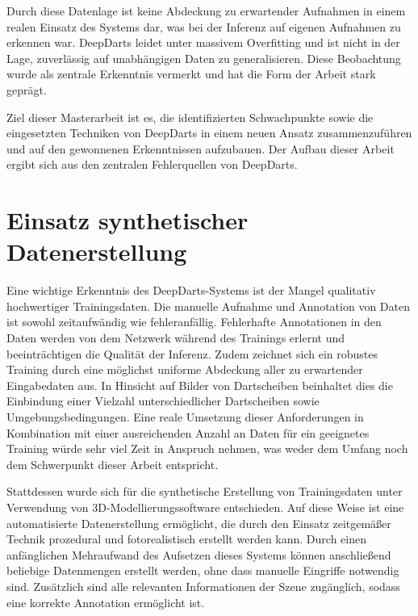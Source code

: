 Durch diese Datenlage ist keine Abdeckung zu erwartender Aufnahmen in einem realen Einsatz des Systems dar, was bei der Inferenz auf eigenen Aufnahmen zu erkennen war. DeepDarts leidet unter massivem Overfitting und ist nicht in der Lage, zuverlässig auf unabhängigen Daten zu generalisieren. Diese Beobachtung wurde als zentrale Erkenntnis vermerkt und hat die Form der Arbeit stark geprägt.

Ziel dieser Masterarbeit ist es, die identifizierten Schwachpunkte sowie die eingesetzten Techniken von DeepDarts in einem neuen Ansatz zusammenzuführen und auf den gewonnenen Erkenntnissen aufzubauen. Der Aufbau dieser Arbeit ergibt sich aus den zentralen Fehlerquellen von DeepDarts.



\section{Einsatz synthetischer Datenerstellung}
\label{sec:einsatz_daten}

Eine wichtige Erkenntnis des DeepDarts-Systems ist der Mangel qualitativ hochwertiger Trainingsdaten. Die manuelle Aufnahme und Annotation von Daten ist sowohl zeitaufwändig wie fehleranfällig. Fehlerhafte Annotationen in den Daten werden von dem Netzwerk während des Trainings erlernt und beeinträchtigen die Qualität der Inferenz. Zudem zeichnet sich ein robustes Training durch eine möglichst uniforme Abdeckung aller zu erwartender Eingabedaten aus. In Hinsicht auf Bilder von Dartscheiben beinhaltet dies die Einbindung einer Vielzahl unterschiedlicher Dartscheiben sowie Umgebungsbedingungen. Eine reale Umsetzung dieser Anforderungen in Kombination mit einer ausreichenden Anzahl an Daten für ein geeignetes Training würde sehr viel Zeit in Anspruch nehmen, was weder dem Umfang noch dem Schwerpunkt dieser Arbeit entspricht.

Stattdessen wurde sich für die synthetische Erstellung von Trainingsdaten unter Verwendung von 3D-Modellierungssoftware entschieden. Auf diese Weise ist eine automatisierte Datenerstellung ermöglicht, die durch den Einsatz zeitgemäßer Technik prozedural und fotorealistisch erstellt werden kann. Durch einen anfänglichen Mehraufwand des Aufsetzen dieses Systems können anschließend beliebige Datenmengen erstellt werden, ohne dass manuelle Eingriffe notwendig sind. Zusätzlich sind alle relevanten Informationen der Szene zugänglich, sodass eine korrekte Annotation ermöglicht ist.

